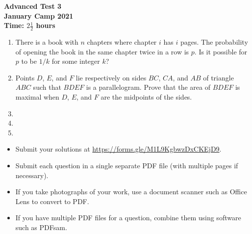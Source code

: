 \documentclass{article}
\begin{document}
\thispagestyle{empty}

\begin{center}
  \textbf{\Large Advanced Test 3}
  \\ \vspace{1em}
  \textbf{\large January Camp 2021}
  \\ \vspace{1em}
  \textbf{\large Time: $2\frac{1}{2}$ hours}
\end{center}

\vspace{24pt}

\begin{enumerate}[1.]

\item %
There is a book with $n$ chapters where chapter $i$ has $i$ pages.
The probability of opening the book in the same chapter twice in a row is $p$.
Is it possible for $p$ to be $1/k$ for some integer $k$?


\item %
Points $D$, $E$, and $F$ lie respectively on sides $BC$, $CA$, and $AB$ of triangle $ABC$ such that $BDEF$ is a parallelogram. Prove that the area of $BDEF$ is maximal when $D$, $E$, and $F$ are the midpoints of the sides.


\item %


\item %


\item %

\end{enumerate}


\vfill
\begin{itemize}
	\item Submit your solutions at \url{https://forms.gle/M1L9KgbwzDxCKEjD9}.
	\item Submit each question in a single separate PDF file (with multiple pages if necessary).
	\item If you take photographs of your work, use a document scanner such as Office Lens to convert to PDF.
	\item If you have multiple PDF files for a question, combine them using software such as PDFsam.
\end{itemize}

\vfill
\centering
\begin{BVerbatim}
\end{BVerbatim}
\end{document}
